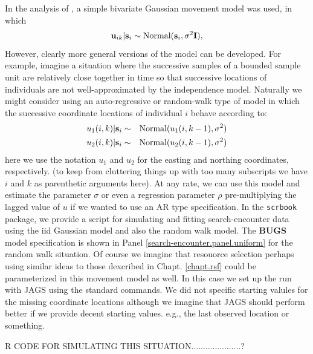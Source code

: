 In the analysis of \citet{royle_young:2008}, a simple bivariate 
Gaussian movement model was used, in which 
\[
 {\bf u}_{ik} | {\bf s}_{i} \sim \mbox{Normal}({\bf s}_{i}, \sigma^{2}{\bf I}),
\]
However, clearly more general versions of the model can be developed.
For example, imagine a situation where the successive samples of a
bounded sample unit are relatively close together in time so that 
successive locations of individuals are not well-approximated by the
independence model. Naturally we might consider using an
auto-regressive or random-walk type of model in which 
the successive coordinate locations of individual $i$ behave according to:
\begin{eqnarray*}
 u_{1}(i,k) | {\bf s}_{i} &\sim &  \mbox{Normal}( u_{1}(i,k-1),  \sigma^{2}) \\
 u_{2}(i,k) | {\bf s}_{i} &\sim &  \mbox{Normal}( u_{2}(i,k-1),  \sigma^{2}) \\
\end{eqnarray*}
here we use the notation $u_{1}$ and $u_{2}$ for the easting and
northing coordinates, respectively. (to keep from cluttering things up
with too many subscripts we have $i$ and $k$ as parenthetic arguments
here).  At any rate, we can use this model and estimate the parameter
$\sigma$ or even a regression parameter $\rho$ pre-multiplying
the lagged value of $u$ if we wanted to use an AR type specification.  
In the \mbox{\tt scrbook} package, we provide a script for
simulating and fitting search-encounter data using the iid Gaussian
model and also the random walk model.  The {\bf BUGS} model specification
is shown in Panel \ref{search-encounter.panel.uniform} for the random
walk situation.  Of course we imagine that resouorce selection
perhaps using similar ideas to those dexcribed in
Chapt. \ref{chapt.rsf} could be parameterized in this movement model
as well. In this case we set up the run with JAGS using the standard
commands. We did not specific starting valules for the missing
coordinate locations although we imagine that JAGS should perform
better if we provide decent starting values. e.g., the last observed
location or something. 


R CODE FOR SIMULATING THIS SITUATION.....................?

